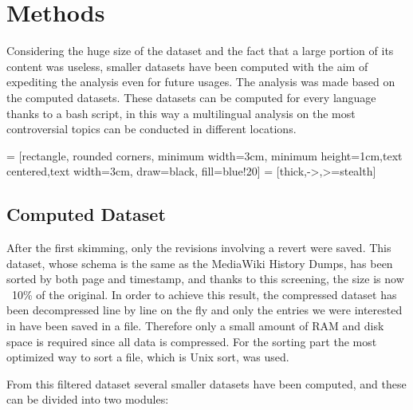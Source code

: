 \chapter{Methods}

Considering the huge size of the dataset and the fact that a large portion of its content was
useless, smaller datasets have been computed with the aim of expediting the analysis even for future
usages. The analysis was made based on the computed datasets. These datasets can be computed for
every language thanks to a bash script, in this way a multilingual analysis on the most
controversial topics can be conducted in different locations.


\bigskip



 = [rectangle, rounded corners, minimum width=3cm, minimum height=1cm,text centered,text width=3cm, draw=black, fill=blue!20]
 = [thick,->,>=stealth]


\bigskip

\section{Computed Dataset}
After the first skimming, only the revisions involving a revert were saved. This dataset, whose
schema is the same as the MediaWiki History Dumps, has been sorted by both page and timestamp, and
thanks to this screening, the size is now ~{10\%} of the original. In order to achieve this result,
the compressed dataset has been decompressed line by line on the fly and only the entries we were
interested in have been saved in a file. Therefore only a small amount of RAM and disk space is
required since all data is compressed. For the sorting part the most optimized way to sort a file,
which is Unix sort, was used.  

From this filtered dataset several smaller datasets have been computed, and these can be divided into two modules: 

